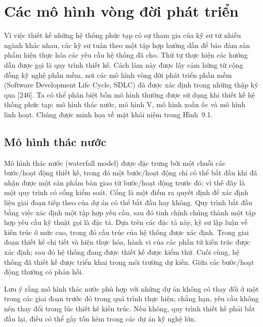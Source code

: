 \section{Các mô hình vòng đời phát triển}
Vì việc thiết kế những hệ thống phức tạp có sự tham gia của kỹ sư từ nhiều ngành khác nhau, các kỹ sư tuân theo một tập hợp hướng dẫn để bảo đảm sản phẩm hiện thực hóa các yêu cầu hệ thống đã cho. Thứ tự thực hiện các hướng dẫn được gọi là quy trình thiết kế. Cách làm này được lấy cảm hứng từ cộng đồng kỹ nghệ phần mềm, nơi các mô hình vòng đời phát triển phần mềm (Software Development Life Cycle, SDLC) đã được xác định trong những thập kỷ qua [246]. Ta có thể phân biệt bốn mô hình thường được sử dụng khi thiết kế hệ thống phức tạp: mô hình thác nước, mô hình V, mô hình xoắn ốc và mô hình linh hoạt. Chúng được minh họa về mặt khái niệm trong Hình~9.1.

\subsection{Mô hình thác nước}
Mô hình thác nước (waterfall model) được đặc trưng bởi một chuỗi các bước/hoạt động thiết kế, trong đó một bước/hoạt động chỉ có thể bắt đầu khi đã nhận được một sản phẩm bàn giao từ bước/hoạt động trước đó; vì thế đây là một quy trình có cổng kiểm soát. Cổng là một điểm ra quyết định để xác định liệu giai đoạn tiếp theo của dự án có thể bắt đầu hay không. Quy trình bắt đầu bằng việc xác định một tập hợp yêu cầu, sau đó tinh chỉnh chúng thành một tập hợp yêu cầu kỹ thuật gọi là đặc tả. Dựa trên các đặc tả này, kỹ sư lập luận về kiến trúc ở mức cao, trong đó cấu trúc của hệ thống được xác định. Trong giai đoạn thiết kế chi tiết và hiện thực hóa, hành vi của các phần tử kiến trúc được xác định; sau đó hệ thống đang được thiết kế được kiểm thử. Cuối cùng, hệ thống đã thiết kế được triển khai trong môi trường dự kiến. Giữa các bước/hoạt động thường có phản hồi.

Lưu ý rằng mô hình thác nước phù hợp với những dự án không có thay đổi ở một trong các giai đoạn trước đó trong quá trình thực hiện; chẳng hạn, yêu cầu không nên thay đổi trong lúc thiết kế kiến trúc. Nếu không, quy trình thiết kế phải bắt đầu lại, điều có thể gây tốn kém trong các dự án kỹ nghệ lớn.


